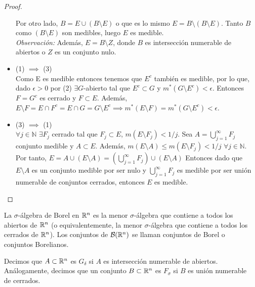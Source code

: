 \begin{proof}
\begin{itemize}
              Por otro lado, $B = E \cup (B \setminus E)$ o que es lo mismo $E = B \setminus (B \setminus E)$. Tanto $B$ como $(B \setminus E)$ son medibles, luego $E$ es medible.\\
              \textit{Observación:} Además, $E = B \setminus Z$, donde $B$ es intersección numerable de abiertos o $Z$ es un conjunto nulo.
        \item (1) $\implies$ (3)\\
              Como E es medible entonces tenemos que $E^c$ también es medible, por lo que, dado $\epsilon > 0$ por (2) $\exists G$-abierto tal que $E^c \subset G$ y $m^*(G \setminus E^c) < \epsilon$. Entonces $F = G^c$ es cerrado y $F \subset E$. Además, $E \setminus F = E \cap F^c = E \cap G = G \setminus E^c \implies m^*(E \setminus F) = m^*(G \setminus E^c) < \epsilon$.
        \item (3) $\implies$ (1)\\
              $\forall j \in \mathbb{N}$ $\exists F_j$ cerrado tal que $F_j \subset E$, $m(E \setminus F_j) < 1/j$. Sea $A = \bigcup_{j = 1}^{\infty} F_j$ conjunto medible y $A \subset E$. Además, $m(E \setminus A) \leq m(E \setminus F_j) < 1/j$ $\forall j \in \mathbb{N}$. Por tanto, $E = A \cup (E\setminus A) = (\bigcup_{j = 1}^{\infty}F_j) \cup (E\setminus A)$ Entonces dado que $E\setminus A$ es un conjunto medible por ser nulo y $\bigcup_{j = 1}^{\infty}F_j$ es medible por ser unión numerable de conjuntos cerrados, entonces $E$ es medible.
    \end{itemize}
\end{proof}

\begin{definición} 
La $\sigma$-álgebra de Borel en $\mathbb{R}^n$ es la menor $\sigma$-álgebra que contiene a todos los abiertos de $\mathbb{R}^n$ (o equivalentemente, la menor $\sigma$-álgebra que contiene a todos los cerrados de $\mathbb{R}^n$). Los conjuntos de $\mathcal{B}(\mathbb{R}^n)$ se llaman conjuntos de Borel o conjuntos Borelianos.\\
\end{definición}

\begin{definición} 
Decimos que $A \subset \mathbb{R}^n$ es $G_\delta$ si $A$ es intersección numerable de abiertos. Análogamente, decimos que un conjunto $B \subset \mathbb{R}^n$ es $F_\sigma$ si $B$ es unión numerable de cerrados.
\end{definición}

